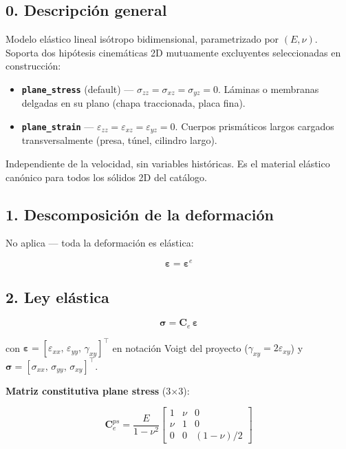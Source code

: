 \documentclass[11pt,letterpaper,oneside]{report}
\begin{document}
\subsection{0. Descripción general}

Modelo elástico lineal isótropo bidimensional, parametrizado por $(E, \nu)$. Soporta dos hipótesis cinemáticas 2D mutuamente excluyentes seleccionadas en construcción:

\begin{itemize}
  \item \textbf{\texttt{plane\_stress}} (default) --- $\sigma_{zz} = \sigma_{xz} = \sigma_{yz} = 0$. Láminas o membranas delgadas en su plano (chapa traccionada, placa fina).
  \item \textbf{\texttt{plane\_strain}} --- $\varepsilon_{zz} = \varepsilon_{xz} = \varepsilon_{yz} = 0$. Cuerpos prismáticos largos cargados transversalmente (presa, túnel, cilindro largo).
\end{itemize}

Independiente de la velocidad, sin variables históricas. Es el material elástico canónico para todos los sólidos 2D del catálogo.

\subsection{1. Descomposición de la deformación}

No aplica --- toda la deformación es elástica:

\[
\boldsymbol\varepsilon = \boldsymbol\varepsilon^e
\]

\subsection{2. Ley elástica}

\[
\boldsymbol\sigma = \mathbf C_e\,\boldsymbol\varepsilon
\]

con $\boldsymbol\varepsilon = [\varepsilon_{xx},\,\varepsilon_{yy},\,\gamma_{xy}]^\top$ en notación Voigt del proyecto ($\gamma_{xy} = 2\varepsilon_{xy}$) y $\boldsymbol\sigma = [\sigma_{xx},\,\sigma_{yy},\,\sigma_{xy}]^\top$.

\textbf{Matriz constitutiva plane stress} (3\ensuremath{\times}3):

\[
\mathbf C^{ps}_e = \frac{E}{1-\nu^2}\begin{bmatrix} 1 & \nu & 0 \\ \nu & 1 & 0 \\ 0 & 0 & (1-\nu)/2 \end{bmatrix}
\]
\end{document}
